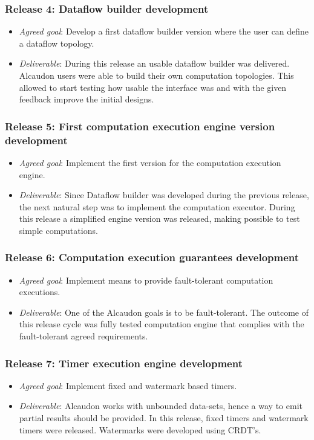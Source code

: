 \subsubsection{Release 4: Dataflow builder development}
\begin{itemize}
\item \textit{Agreed goal}: Develop a first dataflow builder version where the
  user can define a dataflow topology.
\item \textit{Deliverable}: During this release an usable dataflow builder was
  delivered. Alcaudon users were able to build their own computation topologies.
  This allowed to start testing how usable the interface was and with the given
  feedback improve the initial designs.
\end{itemize}

\subsubsection{Release 5: First computation execution engine version development}
\begin{itemize}
\item \textit{Agreed goal}: Implement the first version for the computation
  execution engine.
\item \textit{Deliverable}: Since Dataflow builder was developed during the previous
  release, the next natural step was to implement the computation executor.
  During this release a simplified engine version was released, making possible
  to test simple computations.
\end{itemize}

\subsubsection{Release 6: Computation execution guarantees development}
\begin{itemize}
\item \textit{Agreed goal}: Implement means to provide fault-tolerant computation executions.
\item \textit{Deliverable}: One of the Alcaudon goals is to be fault-tolerant.
  The outcome of this release cycle was fully tested computation engine that
  complies with the fault-tolerant agreed requirements.
\end{itemize}

\subsubsection{Release 7: Timer execution engine development}
\begin{itemize}
\item \textit{Agreed goal}: Implement fixed and watermark based timers.
\item \textit{Deliverable}: Alcaudon works with unbounded data-sets, hence a way
  to emit partial results should be provided. In this release, fixed timers and watermark
  timers were released. Watermarks were developed using CRDT's.
\end{itemize}

